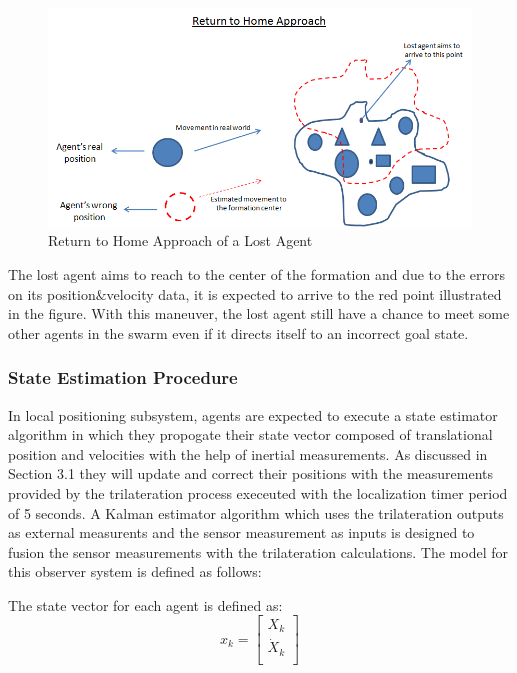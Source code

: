 \documentclass[twoside]{article}
\begin{document}
	
			\begin{figure}[H]
				\caption{Return to Home Approach of a Lost Agent}
				\centering
				\includegraphics[scale = 0.60]{return_home}
			\end{figure}

	
	
	The lost agent aims to reach to the center of the formation and due to the errors on its position$\&$velocity data, it is expected to arrive to the red point illustrated in the figure. With this maneuver, the lost agent still have a chance to meet some other agents in the swarm even if it directs itself to an incorrect goal state. 
	
	
	\subsubsection{State Estimation Procedure}
	In local positioning subsystem, agents are expected to execute a state estimator algorithm in which they propogate their state vector composed of translational position and velocities with the help of inertial measurements. As discussed in Section 3.1 they will update and correct their positions with the measurements provided by the trilateration process execeuted with the localization timer period of 5 seconds. A Kalman estimator algorithm which uses the trilateration outputs as external measurents and the sensor measurement as inputs is designed to fusion the sensor measurements with the trilateration calculations. The model for this observer system is defined as follows:
	
	The state vector for each agent is defined as:
	\begin{equation}
        x_k = \begin{bmatrix}
            X_k \\
            \dot{X}_k\\
                \end{bmatrix}
	\end{equation}
	
\end{document}
